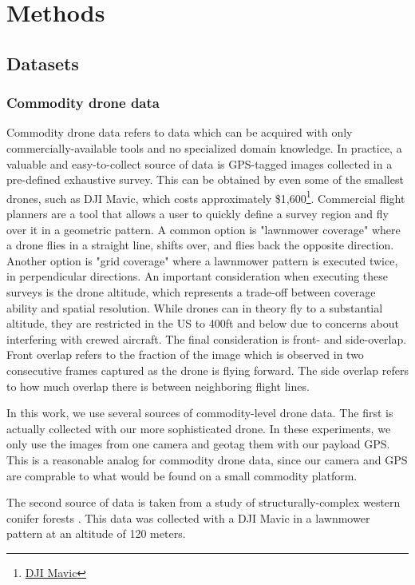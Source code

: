 \chapter{Methods} \label{chapMethod}
\section{Datasets}

\subsection{Commodity drone data}
Commodity drone data refers to data which can be acquired with only commercially-available tools and no specialized domain knowledge. In practice, a valuable and easy-to-collect source of data is GPS-tagged images collected in a pre-defined exhaustive survey. This can be obtained by even some of the smallest drones, such as DJI Mavic, which costs approximately \$1,600\footnote{\href{https://store.dji.com/product/dji-mavic-3-classic}{DJI Mavic}}. Commercial flight planners are a tool that allows a user to quickly define a survey region and fly over it in a geometric pattern. A common option is "lawnmower coverage" where a drone flies in a straight line, shifts over, and flies back the opposite direction. Another option is "grid coverage" where a lawnmower pattern is executed twice, in perpendicular directions. An important consideration when executing these surveys is the drone altitude, which represents a trade-off between coverage ability and spatial resolution. While drones can in theory fly to a substantial altitude, they are restricted in the US to 400ft and below due to concerns about interfering with crewed aircraft. The final consideration is front- and side-overlap. Front overlap refers to the fraction of the image which is observed in two consecutive frames captured as the drone is flying forward. The side overlap refers to how much overlap there is between neighboring flight lines.

In this work, we use several sources of commodity-level drone data. The first is actually collected with our more sophisticated drone. In these experiments, we only use the images from one camera and geotag them with our payload GPS. This is a reasonable analog for commodity drone data, since our camera and GPS are comprable to what would be found on a small commodity platform. 

The second source of data is taken from a study of structurally-complex western conifer forests \cite{Young2022}. This data was collected with a DJI Mavic in a lawnmower pattern at an altitude of 120 meters.

